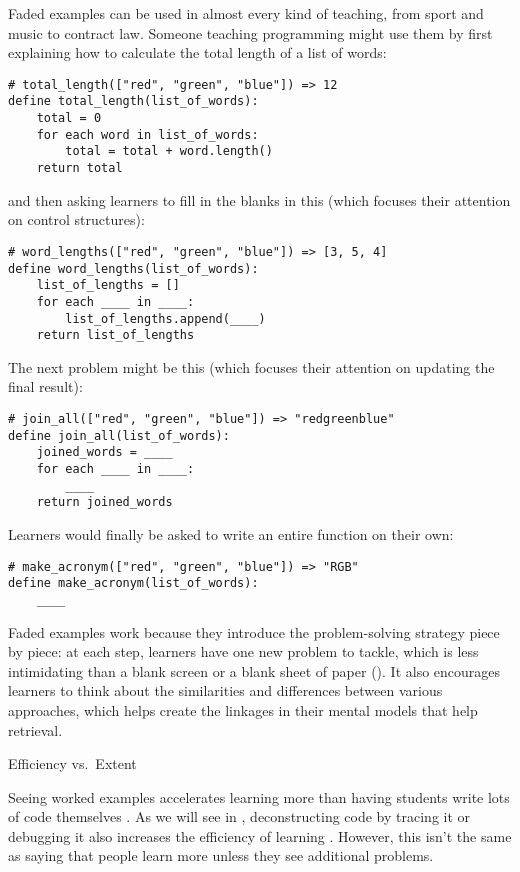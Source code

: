 Faded examples can be used in almost every kind of teaching, from
sport and music to contract law.  Someone teaching programming might
use them by first explaining how to calculate the total length of a
list of words:

\begin{verbatim}
# total_length(["red", "green", "blue"]) => 12
define total_length(list_of_words):
    total = 0
    for each word in list_of_words:
        total = total + word.length()
    return total
\end{verbatim}

\noindent
and then asking learners to fill in the blanks in this (which focuses
their attention on control structures):

\begin{verbatim}
# word_lengths(["red", "green", "blue"]) => [3, 5, 4]
define word_lengths(list_of_words):
    list_of_lengths = []
    for each ____ in ____:
        list_of_lengths.append(____)
    return list_of_lengths
\end{verbatim}

\noindent
The next problem might be this (which focuses their attention on
updating the final result):

\begin{verbatim}
# join_all(["red", "green", "blue"]) => "redgreenblue"
define join_all(list_of_words):
    joined_words = ____
    for each ____ in ____:
        ____
    return joined_words
\end{verbatim}

\noindent
Learners would finally be asked to write an entire function on their
own:

\begin{verbatim}
# make_acronym(["red", "green", "blue"]) => "RGB"
define make_acronym(list_of_words):
    ____
\end{verbatim}

Faded examples work because they introduce the problem-solving
strategy piece by piece: at each step, learners have one new problem
to tackle, which is less intimidating than a blank screen or a blank
sheet of paper (). It also encourages
learners to think about the similarities and differences between
various approaches, which helps create the linkages in their mental
models that help retrieval.

\begin{callout}{Efficiency vs.\ Extent}

  Seeing worked examples accelerates learning more than having
  students write lots of code themselves \cite{Skud2014}.  As we will
  see in , deconstructing code by tracing it or
  debugging it also increases the efficiency of learning
  \cite{Grif2016}.  However, this isn't the same as saying that people
  learn more unless they see additional problems.

\end{callout}

